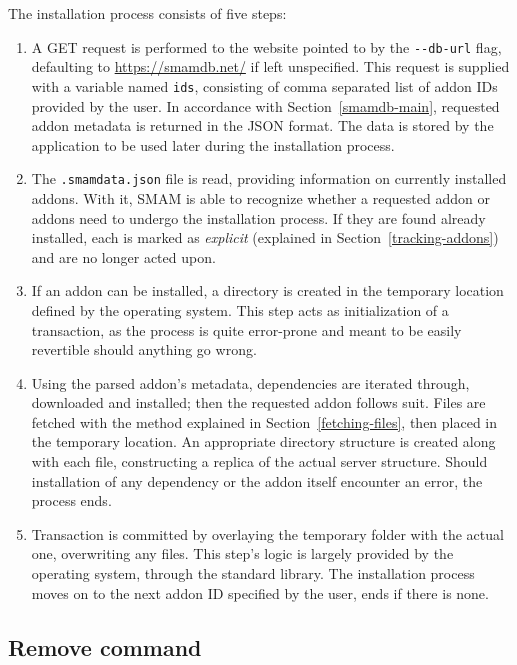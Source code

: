 The installation process consists of five steps:
\begin{enumerate}
\item
A GET request is performed to the website pointed to by the \verb|--db-url| flag, defaulting to \url{https://smamdb.net/} if left unspecified.
This request is supplied with a variable named \verb|ids|, consisting of comma separated list of addon IDs provided by the user.
In accordance with Section~\ref{smamdb-main}, requested addon metadata is returned in the JSON format.
The data is stored by the application to be used later during the installation process.

\item
The \verb|.smamdata.json| file is read, providing information on currently installed addons.
With it, SMAM is able to recognize whether a requested addon or addons need to undergo the installation process.
If they are found already installed, each is marked as \textit{explicit} (explained in Section~\ref{tracking-addons}) and are no longer acted upon.

\item
If an addon can be installed, a directory is created in the temporary location defined by the operating system.
This step acts as initialization of a transaction, as the process is quite error-prone and meant to be easily revertible should anything go wrong.

\item
Using the parsed addon's metadata, dependencies are iterated through, downloaded and installed; then the requested addon follows suit.
Files are fetched with the method explained in Section~\ref{fetching-files}, then placed in the temporary location.
An appropriate directory structure is created along with each file, constructing a replica of the actual server structure.
Should installation of any dependency or the addon itself encounter an error, the process ends.

\item
Transaction is committed by overlaying the temporary folder with the actual one, overwriting any files.
This step's logic is largely provided by the operating system, through the standard library.
The installation process moves on to the next addon ID specified by the user, ends if there is none.
\end{enumerate}

\subsection{Remove command}

